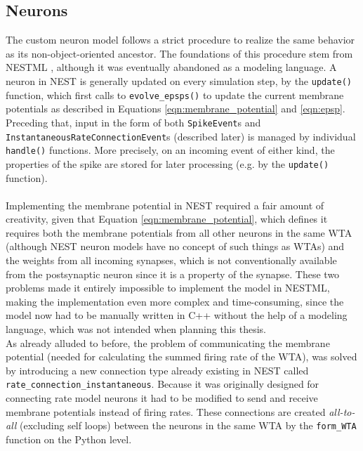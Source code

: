 \subsection{Neurons} \label{ssec:neurons}
The custom neuron model follows a strict procedure to realize the same behavior as its non-object-oriented ancestor. The foundations of this procedure stem from NESTML \parencite{nestml_5_0_0}, although it was eventually abandoned as a modeling language. A neuron in NEST is generally updated on every simulation step, by the \texttt{update()} function, which first calls to \texttt{evolve\_epsps()} to update the current membrane potentials as described in Equations \ref{eqn:membrane_potential} and \ref{eqn:epsp}. Preceding that, input in the form of both \texttt{SpikeEvent}s and \texttt{InstantaneousRateConnectionEvent}s (described later) is managed by individual \texttt{handle()} functions. More precisely, on an incoming event of either kind, the properties of the spike are stored for later processing (e.g. by the \texttt{update()} function). 
\\ \ \\
Implementing the membrane potential in NEST required a fair amount of creativity, given that Equation \ref{eqn:membrane_potential}, which defines it requires both the membrane potentials from all other neurons in the same WTA (although NEST neuron models have no concept of such things as WTAs) and the weights from all incoming synapses, which is not conventionally available from the postsynaptic neuron since it is a property of the synapse. These two problems made it entirely impossible to implement the model in NESTML, making the implementation even more complex and time-consuming, since the model now had to be manually written in C++ without the help of a modeling language, which was not intended when planning this thesis.\\
As already alluded to before, the problem of communicating the membrane potential (needed for calculating the summed firing rate of the WTA), was solved by introducing a new connection type already existing in NEST called \texttt{rate\_connection\_instantaneous}. Because it was originally designed for connecting rate model neurons it had to be modified to send and receive membrane potentials instead of firing rates. These connections are created \textit{all-to-all} (excluding self loops) between the neurons in the same WTA by the \texttt{form\_WTA} function on the Python level.\\
